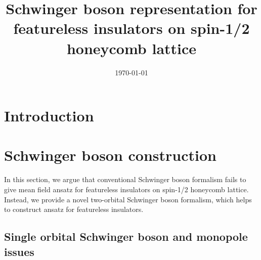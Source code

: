 \documentclass[%
 reprint,
 amsmath,amssymb,
 aps,
 pra, %
]{revtex4-1}
\begin{document}
\title{Schwinger boson representation for featureless insulators on spin-1/2 honeycomb lattice}



\date{\today}

\begin{abstract}
  
\end{abstract}

\maketitle

\tableofcontents

\section{Introduction}


\section{Schwinger boson construction}
In this section, we argue that conventional Schwinger boson formalism fails to give mean field ansatz for featureless insulators on spin-1/2 honeycomb lattice.
Instead, we provide a novel two-orbital Schwinger boson formalism, which helps to construct ansatz for featureless insulators.

\subsection{Single orbital Schwinger boson and monopole issues}
\end{document}

